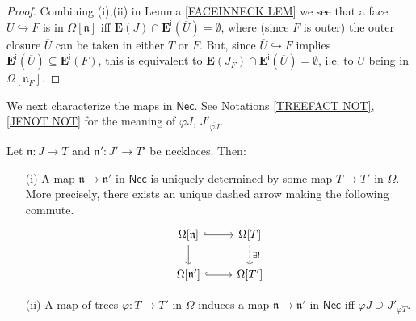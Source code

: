 \documentclass{hha}
\theoremstyle{definition} %
\begin{document}
\begin{proof}
	Combining (i),(ii) in 
	Lemma \ref{FACEINNECK LEM}
	we see that a face $U \hookrightarrow F$ is
	in $\Omega[\mathfrak{n}]$
	iff $\boldsymbol{E}(J) \cap 
	\boldsymbol{E}^{\mathsf{i}}(\overline{U}) = \emptyset$,
	where (since $F$ is outer) the outer closure $\overline{U}$
	can be taken in either $T$ or $F$.
	But,
	since $\overline{U} \hookrightarrow F$
	implies 
	$\boldsymbol{E}^{\mathsf{i}}(\overline{U})
	\subseteq 
	\boldsymbol{E}^{\mathsf{i}}(F)$,
	this is equivalent to 
	$\boldsymbol{E}(J_F) \cap 
	\boldsymbol{E}^{\mathsf{i}}(\overline{U}) = \emptyset$,
	i.e. to $U$ being in $\Omega[\mathfrak{n}_F]$.
\end{proof}


We next characterize the maps in $\mathsf{Nec}$.
See Notations \ref{TREEFACT NOT}, \ref{JFNOT NOT}
for the meaning of
$\varphi J$,
$J'_{\overline{\varphi J}}$.



\begin{proposition}\label{MAPNECK PROP}
	Let $\mathfrak{n}\colon J \to T$ and $\mathfrak{n}' \colon J' \to T'$ be necklaces. Then:
\begin{enumerate}
\item[(i)]
	A map $\mathfrak{n} \to \mathfrak{n}'$ in $\mathsf{Nec}$
	is uniquely determined by some map 
	$T \to T'$ in $\Omega$. 
	More precisely, there exists an unique dashed arrow
	making the following commute.
\begin{equation}\label{NECKMAP EQ}
\begin{tikzcd}
	\Omega[\mathfrak{n}] 
	\ar[hookrightarrow]{r} 
	\ar{d}
&
	\Omega[T] 
	\ar[dashed]{d}{\exists !}
\\
	\Omega[\mathfrak{n}']
	\ar[hookrightarrow]{r}
&
	\Omega[T']
	\end{tikzcd}
\end{equation}
\item[(ii)]
	A map of trees 
	$\varphi \colon T \to T'$ in $\Omega$
	induces a map 
	$\mathfrak{n} \to \mathfrak{n}'$ in $\mathsf{Nec}$
	iff
	$\varphi J \supseteq J'_{\overline{\varphi T}}$.
\end{enumerate}
\end{proposition}
\end{document}
